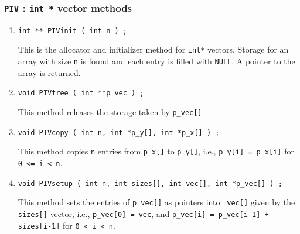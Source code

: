 \par
\subsubsection{{\tt PIV} : {\tt int *} vector methods}
\label{subsubsection:Utilities:proto:PIV}
\par
\begin{enumerate}
\item
\begin{verbatim}
int ** PIVinit ( int n ) ;
\end{verbatim}
This is the allocator and initializer method for {\tt int*} vectors.
Storage for an array with size {\tt n} is found and each
entry is filled with {\tt NULL}.
A pointer to the array is returned.
\item
\begin{verbatim}
void PIVfree ( int **p_vec ) ;
\end{verbatim}
This method releases the storage taken by {\tt p\_vec[]}.
\item
\begin{verbatim}
void PIVcopy ( int n, int *p_y[], int *p_x[] ) ;
\end{verbatim}
This method copies {\tt n} entries from {\tt p\_x[]} to {\tt p\_y[]},
i.e.,
{\tt p\_y[i] = p\_x[i]} for {\tt 0 <= i < n}.
\item
\begin{verbatim}
void PIVsetup ( int n, int sizes[], int vec[], int *p_vec[] ) ;
\end{verbatim}
This method sets the entries of {\tt p\_vec[]} as pointers into {\tt
vec[]} given by the {\tt sizes[]} vector,
i.e.,
{\tt p\_vec[0] = vec}, and 
{\tt p\_vec[i] = p\_vec[i-1] + sizes[i-1]} 
for {\tt 0 < i < n}.
\end{enumerate}
